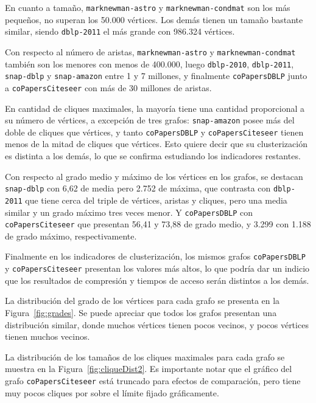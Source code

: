 En cuanto a tamaño, \texttt{marknewman-astro} y \texttt{marknewman-condmat} son los más pequeños, no superan los 50.000 vértices. Los demás tienen un tamaño bastante similar, siendo \texttt{dblp-2011} el más grande con 986.324 vértices.

Con respecto al número de aristas, \texttt{marknewman-astro} y \texttt{marknewman-condmat} también son los menores con menos de 400.000, luego \texttt{dblp-2010}, \texttt{dblp-2011}, \texttt{snap-dblp} y \texttt{snap-amazon} entre 1 y 7 millones, y finalmente \texttt{coPapersDBLP} junto a \texttt{coPapersCiteseer} con más de 30 millones de aristas.

En cantidad de cliques maximales, la mayoría tiene una cantidad proporcional a su número de vértices, a excepción de tres grafos: \texttt{snap-amazon} posee más del doble de cliques que vértices, y tanto \texttt{coPapersDBLP} y \texttt{coPapersCiteseer} tienen menos de la mitad de cliques que vértices. Esto quiere decir que su clusterización es distinta a los demás, lo que se confirma estudiando los indicadores restantes.

Con respecto al grado medio y máximo de los vértices en los grafos, se destacan \texttt{snap-dblp} con 6,62 de media pero 2.752 de máxima, que contrasta con \texttt{dblp-2011} que tiene cerca del triple de vértices, aristas y cliques, pero una media similar y un grado máximo tres veces menor. Y \texttt{coPapersDBLP} con \texttt{coPapersCiteseer} que presentan 56,41 y 73,88 de grado medio, y 3.299 con 1.188 de grado máximo, respectivamente.

Finalmente en los indicadores de clusterización, los mismos grafos \texttt{coPapersDBLP} y \texttt{coPapersCiteseer} presentan los valores más altos, lo que podría dar un indicio que los resultados de compresión y tiempos de acceso serán distintos a los demás. 


%
%


La distribución del grado de los vértices para cada grafo se presenta en la Figura~\ref{fig:grades}. Se puede apreciar que todos los grafos presentan una distribución similar, donde muchos vértices tienen pocos vecinos, y pocos vértices tienen muchos vecinos.




La distribución de los tamaños de los cliques maximales para cada grafo se muestra en la Figura~\ref{fig:cliqueDist2}. Es importante notar que el gráfico del grafo \texttt{coPapersCiteseer} está truncado para efectos de comparación, pero tiene muy pocos cliques por sobre el límite fijado gráficamente.

